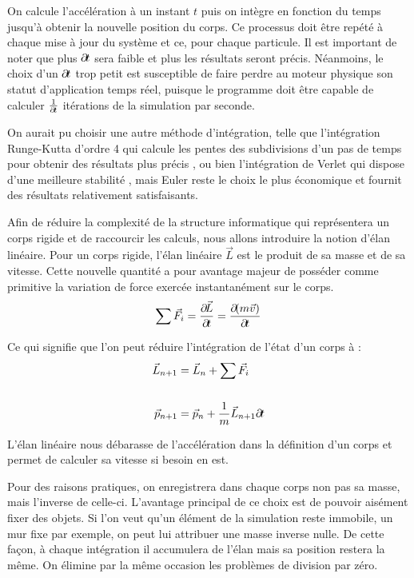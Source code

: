 On calcule l'accélération à un instant $t$ puis on intègre en fonction
du temps jusqu'à obtenir la nouvelle position du corps. Ce processus
doit être repété à chaque mise à jour du système et ce, pour chaque
particule. Il est important de noter que plus $\partial \! t$ sera faible
et plus les résultats seront précis. Néanmoins, le choix d'un $\partial \!
t$ trop petit est susceptible de faire perdre au moteur physique son
statut d'application temps réel, puisque le programme doit être
capable de calculer $\frac{1}{\partial \! t}$ itérations de la simulation
par seconde.

On aurait pu choisir une autre méthode d'intégration, telle que
l'intégration Runge-Kutta d'ordre 4 qui calcule les pentes des
subdivisions d'un pas de temps pour obtenir des résultats plus précis
\cite{fiedler}, ou bien l'intégration de Verlet qui dispose d'une
meilleure stabilité \cite{bitterli}, mais Euler reste le choix le plus
économique et fournit des résultats relativement satisfaisants.

Afin de réduire la complexité de la structure informatique qui
représentera un corps rigide et de raccourcir les calculs, nous allons
introduire la notion d'élan linéaire. Pour un corps rigide, l'élan
linéaire $\vec{L}$ est le produit de sa masse et de sa vitesse. Cette
nouvelle quantité a pour avantage majeur de posséder comme primitive
la variation de force exercée instantanément sur le corps.
\begin{align*}
  {\sum \vec{F}_i} = \frac{\partial \! \vec{L}}{\partial \! t} = \frac{\partial \! (m\vec{v})}{\partial \! t}
\end{align*}

Ce qui signifie que l'on peut réduire l'intégration de l'état d'un
corps à :
\begin{align*}
  \vec{L}_{n+1} &= \vec{L}_n + {\sum \vec{F}_i} \\ \\
  \vec{p}_{n+1} &= \vec{p}_n + \frac{1}{m}\vec{L}_{n+1} \partial \! t
\end{align*}

L'élan linéaire nous débarasse de l'accélération dans la définition
d'un corps et permet de calculer sa vitesse si besoin en est.

Pour des raisons pratiques, on enregistrera dans chaque corps non pas
sa masse, mais l'inverse de celle-ci. L'avantage principal de ce choix
est de pouvoir aisément fixer des objets. Si l'on veut qu'un élément
de la simulation reste immobile, un mur fixe par exemple, on peut lui
attribuer une masse inverse nulle. De cette façon, à chaque
intégration il accumulera de l'élan mais sa position restera la
même. On élimine par la même occasion les problèmes de division par
zéro.

